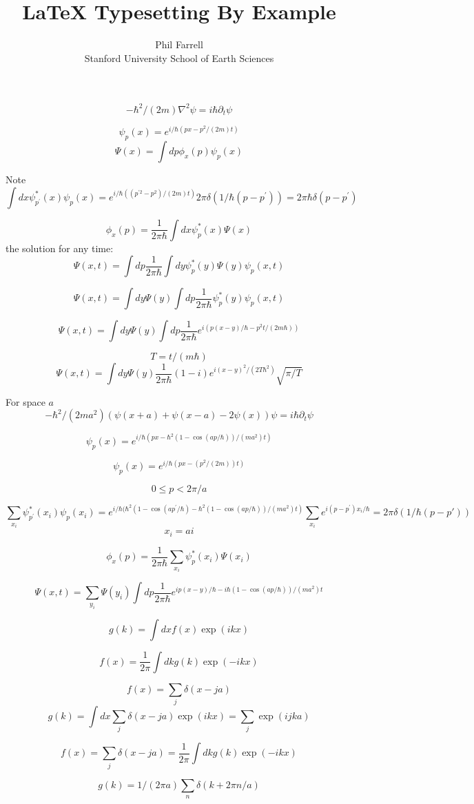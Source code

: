 


\title{LaTeX Typesetting By Example}
\author{Phil Farrell\\
Stanford University School of Earth Sciences}

\renewcommand{\today}{November 2, 1994}
\maketitle

$$
-\hbar^2/(2m) \nabla^2 \psi = i \hbar \partial_t \psi
$$

$$
\psi_p(x) = e^{ i/\hbar (p x - p^2 /(2m)t)}
$$
$$
\Psi(x) = \int dp \phi_x(p) \psi_p(x)
$$

Note
$$
\int dx \psi_{p^\prime}^*(x) \psi_{p}(x) = e^{ i/\hbar ((p^{\prime2} - p^2) /(2m)t)} 2\pi\delta(1/\hbar(p-p^\prime))
=2\pi\hbar\delta(p-p^\prime)
$$

$$
\phi_x(p) = \frac{1}{2\pi\hbar}\int dx \psi^*_p(x) \Psi(x)
$$
the solution for any time:
$$
\Psi(x, t) = \int dp \frac{1}{2\pi\hbar}\int dy \psi^*_p(y) \Psi(y) \psi_p(x,t)
$$

$$
\Psi(x, t) = \int dy  \Psi(y) \int dp \frac{1}{2\pi\hbar}\psi^*_p(y) \psi_p(x,t)
$$

$$
\Psi(x, t) = \int dy  \Psi(y) \int dp \frac{1}{2\pi\hbar} e^{i(p(x-y)/\hbar - p^2 t/(2m\hbar))}
$$

$$
T=t/(m\hbar)
$$
$$
\Psi(x, t) = \int dy  \Psi(y) \frac{1}{2\pi\hbar} (1-i) e^{i (x-y)^2 / (2 T \hbar^2)}  \sqrt{\pi / T}
$$


For space $a$
$$
-\hbar^2/(2m a^2) (\psi(x+a) + \psi(x-a) - 2\psi(x)) \psi = i \hbar \partial_t \psi
$$

$$
\psi_p(x) = e^{ i/\hbar (p x - \hbar^2(1 - \cos(a p/\hbar))/(m a^2)t)}
$$

$$
\psi_p(x) = e^{ i/\hbar (p x - (p^2/(2m))t)}
$$

$$
0 \le p < 2\pi / a
$$

$$
\sum_{x_i} \psi_{p^\prime}^*(x_i) \psi_{p}(x_i) = e^{ i/\hbar (\hbar^2(1 - \cos(a p^\prime/\hbar) - \hbar^2(1 - \cos(a p/\hbar))/(m a^2)t)}
\sum_{x_i}e^{i(p-p^\prime)x_i/\hbar} = 2\pi\delta(1/\hbar(p - p\prime))
$$
$$
x_i = ai
$$

$$
\phi_x(p) = \frac{1}{2\pi\hbar}\sum_{x_i} \psi^*_p(x_i) \Psi(x_i)
$$

$$
\Psi(x, t) = \sum_{y_i} \Psi(y_i) \int dp \frac{1}{2\pi\hbar} e^{ ip(x-y)/\hbar - i\hbar(1 - \cos(a p/\hbar))/(m a^2)t}
$$



$$
g(k) = \int dx f(x) \exp(ikx)
$$

$$
f(x) = \frac{1}{2\pi}\int dk g(k) \exp(-ikx)
$$

$$
f(x) = \sum_j \delta(x - ja)
$$
$$
g(k) = \int dx \sum_j \delta(x - ja) \exp(ikx) = \sum_j \exp(ijka)
$$

$$
f(x) = \sum_j \delta(x - ja) = \frac{1}{2\pi}\int dk g(k) \exp(-ikx)
$$

$$
g(k) = 1/(2\pi a)\sum_n \delta(k+2\pi n/a)
$$



